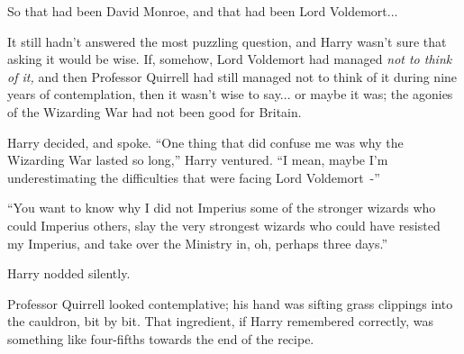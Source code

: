 So that had been David Monroe, and that had been Lord Voldemort...

It still hadn't answered the most puzzling question, and Harry wasn't sure that asking it would be wise. If, somehow, Lord Voldemort had managed \emph{not to think of it,} and then Professor Quirrell had still managed not to think of it during nine years of contemplation, then it wasn't wise to say... or maybe it was; the agonies of the Wizarding War had not been good for Britain.

Harry decided, and spoke. ``One thing that did confuse me was why the Wizarding War lasted so long,'' Harry ventured. ``I mean, maybe I'm underestimating the difficulties that were facing Lord Voldemort~-''

``You want to know why I did not Imperius some of the stronger wizards who could Imperius others, slay the very strongest wizards who could have resisted my Imperius, and take over the Ministry in, oh, perhaps three days.''

Harry nodded silently.

Professor Quirrell looked contemplative; his hand was sifting grass clippings into the cauldron, bit by bit. That ingredient, if Harry remembered correctly, was something like four-fifths towards the end of the recipe.


